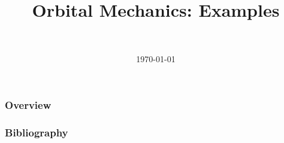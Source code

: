 \documentclass[]{beamer}
\title
[Orbital Mechanics: Examples]
{Orbital Mechanics: Examples}
\author[Daniel Topa]{\TopaHII \\ \TopaHIIEmail}
\institute{\missiontech}
\date{\today}
\begin{document}
%

\begin{frame}
	\titlepage
\end{frame}

\begin{frame}\frametitle{Overview}
	\tableofcontents[hideallsubsections]
\end{frame}

	
	
%	
	

{\tiny{
\begin{frame}[allowframebreaks]\frametitle{Bibliography}
	\printbibliography
\end{frame}}}

\begin{frame}
	\titlepage
\end{frame}
\end{document}
